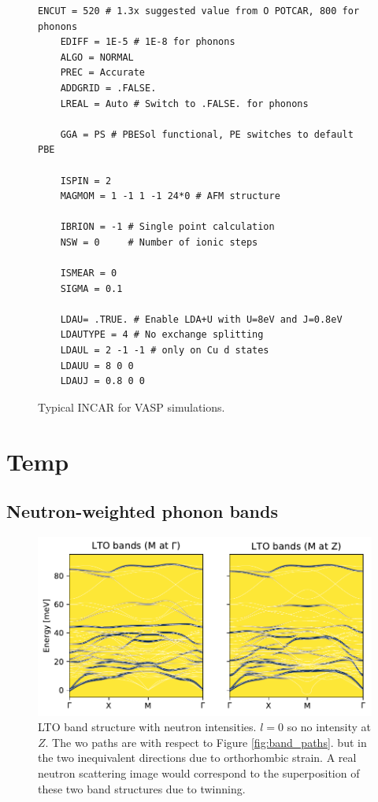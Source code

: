 \begin{figure}
    \centering
    \begin{lstlisting}[basicstyle=\footnotesize\ttfamily, frame=single]
    ENCUT = 520 # 1.3x suggested value from O POTCAR, 800 for phonons
    EDIFF = 1E-5 # 1E-8 for phonons
    ALGO = NORMAL
    PREC = Accurate
    ADDGRID = .FALSE.
    LREAL = Auto # Switch to .FALSE. for phonons
    
    GGA = PS # PBESol functional, PE switches to default PBE
    
    ISPIN = 2
    MAGMOM = 1 -1 1 -1 24*0 # AFM structure
    
    IBRION = -1 # Single point calculation
    NSW = 0     # Number of ionic steps
    
    ISMEAR = 0
    SIGMA = 0.1
    
    LDAU= .TRUE. # Enable LDA+U with U=8eV and J=0.8eV
    LDAUTYPE = 4 # No exchange splitting
    LDAUL = 2 -1 -1 # only on Cu d states
    LDAUU = 8 0 0 
    LDAUJ = 0.8 0 0
    \end{lstlisting}
    \caption[VASP: Typical INCAR]{Typical INCAR for VASP simulations.}
    \label{fig:incar}
\end{figure}

\chapter{Temp}

\section{Neutron-weighted phonon bands}

\begin{figure}
	\centering
	\includegraphics[width=\textwidth]{fig/simulation/lto_neutron_bands.pdf}
	\caption[LTO band structure with neutron intensities]{LTO band structure with neutron intensities. $l=0$ so no intensity at $Z$. The wo paths are with respect to Figure \ref{fig:band_paths}. but in the two inequivalent directions due to orthorhombic strain. A real neutron scattering image would correspond to the superposition of these two band structures due to twinning.}
	\label{fig:lco_lto_netron_bands}
\end{figure}

